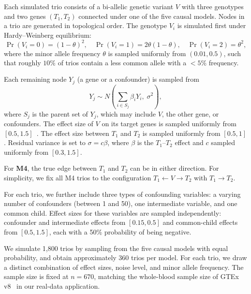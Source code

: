 \documentclass[12pt,letterpaper]{report}
\begin{document}
\begin{doublespace}
Each simulated trio consists of a bi-allelic genetic variant $V$ with three genotypes and two genes $(T_1, T_2)$ connected under one of the five causal models. 
Nodes in a trio are generated in topological order. The genotype $V_i$ is simulated first under Hardy--Weinberg equilibrium:
\[
\Pr(V_i = 0) = (1-\theta)^2,\quad 
\Pr(V_i = 1) = 2\theta(1-\theta),\quad
\Pr(V_i = 2) = \theta^2,
\]
where the minor allele frequency $\theta$ is sampled uniformly from $(0.01, 0.5)$, such that roughly $10\%$ of trios contain a less common allele with a $<5\%$ frequency.

Each remaining node $Y_j$ (a gene or a confounder) is sampled from
\[
Y_j \sim N\!\left(\sum_{i\in S_j} \beta_i Y_i,\;\sigma^2\right),
\]
where $S_j$ is the parent set of $Y_j$, which may include $V$, the other gene, or confounders.
The effect size of $V$ on its target genes is sampled uniformly from $[0.5, 1.5]$~\cite{yang2017identifying}. 
The effect size between $T_1$ and $T_2$ is sampled uniformly from $[0.5, 1]$. Residual variance is set to $\sigma = c \beta$,
where $\beta$ is the $T_1$--$T_2$ effect and $c$ sampled uniformly from $[0.3, 1.5]$.

For \textbf{M4}, the true edge between $T_1$ and $T_2$ can be in either direction. For simplicity, we fix all M4 trios to the configuration $T_1 \leftarrow V \rightarrow T_2$ with $T_1 \rightarrow T_2$.

For each trio, we further include three types of confounding variables: a varying number of confounders (between 1 and 50), one intermediate variable, and one common child. Effect sizes for these variables are sampled independently: confounder and intermediate effects from $[0.15, 0.5]$ and common-child effects from $[0.5, 1.5]$, each with a 50\% probability of being negative.

We simulate 1,800 trios by sampling from the five causal models with equal probability, and obtain approximately 360 trios per model. For each trio, we draw a distinct combination of effect sizes, noise level, and minor allele frequency. The sample size is fixed at $n = 670$, matching the whole-blood sample size of GTEx v8~\cite{gtex2020} in our real-data application.



\end{doublespace}
\end{document}
